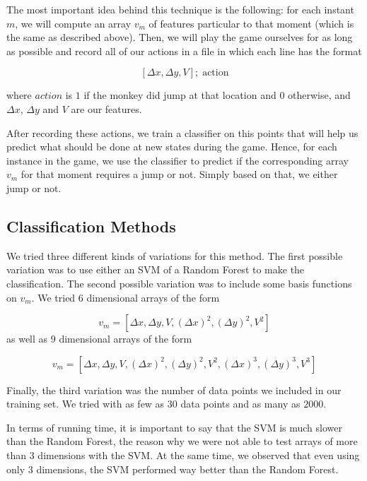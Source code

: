 \documentclass[10pt]{article}
\begin{document}
\medskip

The most important idea behind this technique is the following: for each instant 
$m$, we will compute an array $v_m$ of features particular to that moment (which
is the same as described above). Then, we will play the game ourselves for as 
long as possible and record all of our actions in a file in which each line has the format 

\[ [\Delta x, \Delta y, V]; \; \text{action} \]

where $action$ is $1$ if the monkey did jump at that location and $0$ otherwise,
and $\Delta x$, $\Delta y$ and $V$ are our features.

\medskip

After recording these actions, we train a classifier on this points that will 
help us predict what should be done at new states during the game. Hence, for 
each instance in the game, we use the classifier to predict if the corresponding 
array $v_m$ for that moment requires a jump or not. Simply based on that, we 
either jump or not.

\subsection{Classification Methods}

We tried three different kinds of variations for this method. The first possible 
variation was to use either an SVM of a Random Forest to make the classification.
 The second possible variation was to include some basis functions on $v_m$. We 
 tried $6$ dimensional arrays of the form

\[v_m = [\Delta x, \Delta y, V, (\Delta x)^2, (\Delta y)^2, V^2]\]
as well as $9$ dimensional arrays of the form

\[v_m = [\Delta x, \Delta y, V, (\Delta x)^2, (\Delta y)^2, V^2, (\Delta x)^3, 
(\Delta y)^3, V^3]\]

\medskip

Finally, the third variation was the number of data points we included in our 
training set. We tried with as few as $30$ data points and as many as $2000$. 

\medskip

In terms of running time, it is important to say that the SVM is much slower 
than the Random Forest, the reason why we were not able to test arrays of more 
than $3$ dimensions with the SVM. At the same time, we observed that even using 
only $3$ dimensions, the SVM performed way better than the Random Forest.
\end{document}
